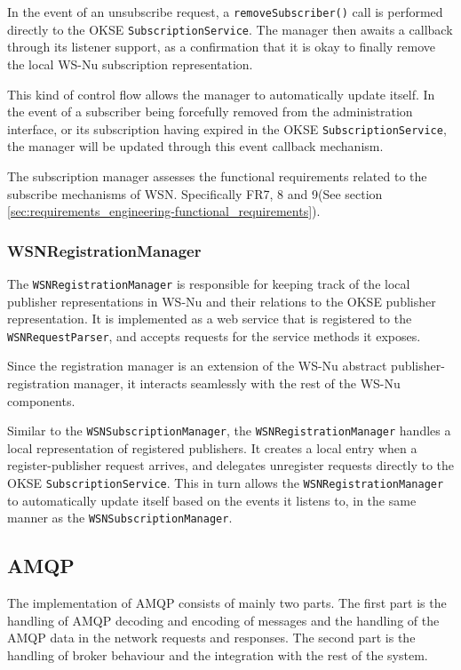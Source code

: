 In the event of an unsubscribe request, a \verb!removeSubscriber()! call is performed directly to the OKSE \verb!SubscriptionService!. The manager then awaits a callback through its listener support, as a confirmation that it is okay to finally remove the local WS-Nu subscription representation.

This kind of control flow allows the manager to automatically update itself. In the event of a subscriber being forcefully removed from the administration interface, or its subscription having expired in the OKSE \verb!SubscriptionService!, the manager will be updated through this event callback mechanism.

The subscription manager assesses the functional requirements related to the subscribe mechanisms of WSN. Specifically FR7, 8 and 9(See section \ref{sec:requirements_engineering-functional_requirements}).

\subsubsection{WSNRegistrationManager}

The \verb!WSNRegistrationManager! is responsible for keeping track of the local publisher representations in WS-Nu and their relations to the OKSE publisher representation. It is implemented as a web service that is registered to the \verb!WSNRequestParser!, and accepts requests for the service methods it exposes.

Since the registration manager is an extension of the WS-Nu abstract publisher-registration manager, it interacts seamlessly with the rest of the WS-Nu components.

Similar to the \verb!WSNSubscriptionManager!, the \verb!WSNRegistrationManager! handles a local representation of registered publishers. It creates a local entry when a register-publisher request arrives, and delegates unregister requests directly to the OKSE \verb!SubscriptionService!. This in turn allows the \verb!WSNRegistrationManager! to automatically update itself based on the events it listens to, in the same manner as the \verb!WSNSubscriptionManager!.

\subsection{AMQP}
\label{subsec:architecture_and_implementation-implementation-amqp}
The implementation of AMQP consists of mainly two parts. The first part is the handling of AMQP decoding and encoding of messages and the handling of the AMQP data in the network requests and responses. The second part is the handling of broker behaviour and the integration with the rest of the system. 

